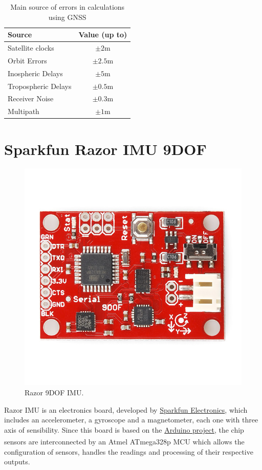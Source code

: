 \begin{table}[!htb]
	\centering
	\begin{tabular}{lc}
		\toprule
		\textbf{Source}		& \textbf{Value (up to)}\\
		\midrule
		Satellite clocks	& $\pm2$m\\
		Orbit Errors		& $\pm2.5$m\\
		Inospheric Delays	& $\pm5$m\\
		Tropospheric Delays & $\pm0.5$m\\
		Receiver Noise		& $\pm0.3$m\\
		Multipath			& $\pm1$m\\
		\bottomrule
	\end{tabular}
	\caption[Main source of errors in calculations using GNSS]{Main source of errors in calculations using GNSS \cite{NovatelIntroGNSS}}
	\label{tab:gnss_error_source}
\end{table}
\vfill

\section{Sparkfun Razor IMU 9DOF} \label{section:sparkfun}

\begin{figure}[!htb]
	\centering
	\includegraphics[width=0.5\linewidth]{figures/10125-04b.jpg}
	\caption[Razor 9DOF IMU.]{Razor 9DOF IMU.}
	\label{fig:razor9dof}
\end{figure}

Razor IMU  is an electronics board, developed by
\href{http://www.sparkfun.com/}{Sparkfun Electronics}, which includes an
accelerometer, a gyroscope and a magnetometer, each one with three axis of
sensibility. Since this board is based on the
\href{https://www.arduino.cc/}{Arduino project}, the chip sensors are
interconnected by an Atmel\textsuperscript{\textregistered} ATmega328p \gls{MCU}
which allows the configuration of sensors, handles the readings and processing
of their respective outputs. 


